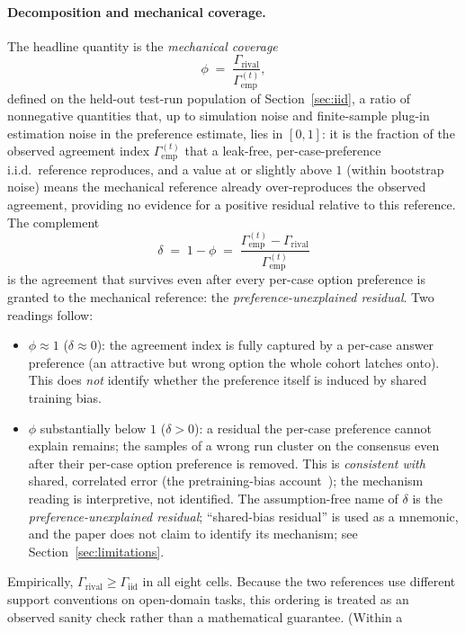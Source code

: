 \documentclass{article}
\newcommand{\agreementIndex}{\Gamma}
\begin{document}
\paragraph{Decomposition and mechanical coverage.}
The headline quantity is the \emph{mechanical coverage}
\[
\phi \;=\; \frac{\agreementIndex_{\mathrm{rival}}}{\agreementIndex_{\mathrm{emp}}^{(t)}},
\]
defined on the held-out test-run population of Section~\ref{sec:iid},
a ratio of nonnegative quantities that, up to simulation noise and
finite-sample plug-in estimation noise in the preference estimate, lies in
$[0,1]$: it is the fraction of the observed agreement index
$\agreementIndex_{\mathrm{emp}}^{(t)}$ that a
leak-free, per-case-preference i.i.d.\ reference reproduces, and a value
at or slightly above $1$ (within bootstrap noise) means the mechanical
reference already over-reproduces the observed agreement, providing no
evidence for a positive residual relative to this reference. The complement
\[
\delta \;=\; 1-\phi \;=\; \frac{\agreementIndex_{\mathrm{emp}}^{(t)}-\agreementIndex_{\mathrm{rival}}}{\agreementIndex_{\mathrm{emp}}^{(t)}}
\]
is the agreement that survives even after every per-case option
preference is granted to the mechanical reference: the \emph{preference-unexplained
residual}. Two readings follow:
\begin{itemize}
\item $\phi\approx1$ ($\delta\approx0$): the agreement index is
  fully captured by a per-case answer preference (an attractive but wrong
  option the whole cohort latches onto). This does \emph{not} identify
  whether the preference itself is induced by shared training bias.
\item $\phi$ substantially below $1$ ($\delta>0$): a residual the
  per-case preference cannot explain remains; the samples of a wrong run cluster
  on the consensus even after their per-case option preference is
  removed. This is \emph{consistent with}
  shared, correlated error (the pretraining-bias
  account~\cite{mccoy2024}); the mechanism reading is interpretive, not identified. The assumption-free name of
  $\delta$ is the \emph{preference-unexplained residual}; ``shared-bias residual'' is used as a mnemonic, and
the paper does not claim to identify its mechanism; see
  Section~\ref{sec:limitations}.
\end{itemize}
Empirically, $\agreementIndex_{\mathrm{rival}}\ge\agreementIndex_{\mathrm{iid}}$ in all
eight cells. Because the two references use different support
conventions on open-domain tasks, this ordering is treated as an
observed sanity check rather than a mathematical guarantee. (Within a
\end{document}
